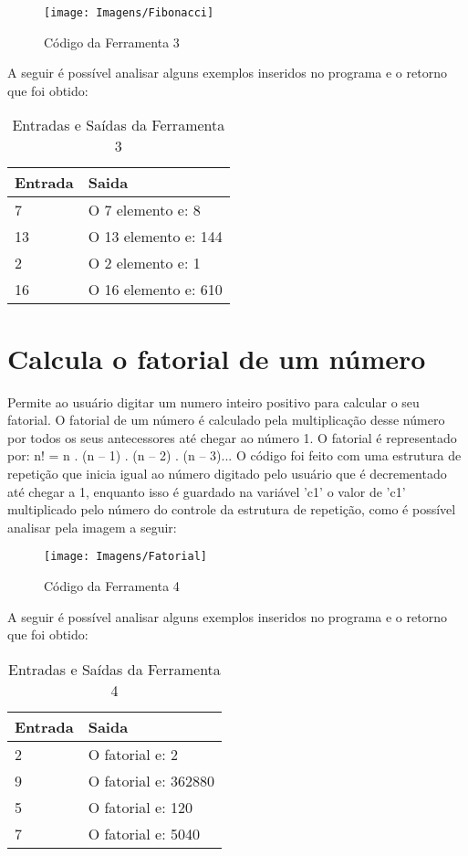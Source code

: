 \documentclass[12pt]{article}
\begin{document}
\begin{figure}[!htb]
     \centering
     \texttt{[image: Imagens/Fibonacci]}
     \caption{Código da Ferramenta 3}
     \label{Label de referência para a imagem}
\end{figure}

A seguir é possível analisar alguns exemplos inseridos no programa e o retorno que foi obtido:

\FloatBarrier
\begin{table}[ht]
\centering
\begin{tabular}{|l|l|}
\hline
\textbf{Entrada} & \textbf{Saida}\\
\hline
7 & O 7 elemento e: 8\\
13 & O 13 elemento e: 144\\
2 & O 2 elemento e: 1\\
16 & O 16 elemento e: 610\\

\hline
\end{tabular}
\caption{Entradas e Saídas da Ferramenta 3}
\end{table} 

\newpage

\section{Calcula o fatorial de um número}
Permite ao usuário digitar um numero inteiro positivo para calcular o seu fatorial.
O fatorial de um número é calculado pela multiplicação desse número por todos os seus antecessores até chegar ao número 1.
O fatorial é representado por: n! = n . (n – 1) . (n – 2) . (n – 3)...
O código foi feito com uma estrutura de repetição que inicia igual ao número digitado pelo usuário que é decrementado até chegar a 1, enquanto isso é guardado na variável 'c1' o valor de 'c1' multiplicado pelo número do controle da estrutura de repetição, como é possível analisar pela imagem a seguir:

\begin{figure}[!htb]
     \centering
     \texttt{[image: Imagens/Fatorial]}
     \caption{Código da Ferramenta 4}
     \label{Label de referência para a imagem}
\end{figure}

A seguir é possível analisar alguns exemplos inseridos no programa e o retorno que foi obtido:

\FloatBarrier
\begin{table}[ht]
\centering
\begin{tabular}{|l|l|}
\hline
\textbf{Entrada} & \textbf{Saida}\\
\hline
2 & O fatorial e: 2\\
9 & O fatorial e: 362880\\
5 & O fatorial e: 120\\
7 & O fatorial e: 5040\\

\hline
\end{tabular}
\caption{Entradas e Saídas da Ferramenta 4}
\end{table} 
\end{document}
